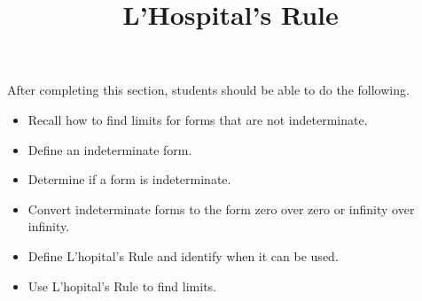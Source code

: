 \documentclass{ximera}
\title{L'Hospital's Rule}
\begin{document}
\begin{abstract}
\end{abstract}

\maketitle

\begin{sectionOutcomes}

After completing this section, students should be able to do the following.

\begin{itemize}
	\item Recall how to find limits for forms that are not indeterminate.
	\item Define an indeterminate form.
	\item Determine if a form is indeterminate.
	\item Convert indeterminate forms to the form zero over zero
          or infinity over infinity.
	\item Define L'hopital's Rule and identify when it can be used.
	\item Use L'hopital's Rule to find limits.
\end{itemize}

\end{sectionOutcomes}
\end{document}
